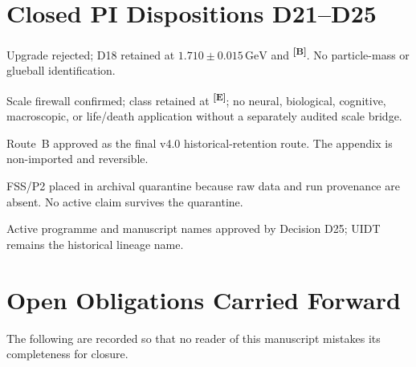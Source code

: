\documentclass[12pt,a4paper,twoside]{article}
\theoremstyle{plain}
\theoremstyle{definition}
\theoremstyle{remark}
\newcommand{\catmark}[1]{\textsuperscript{\textsf{\textbf{[#1]}}}}
\begin{document}
\section{Closed PI Dispositions D21--D25}
\label{sec:closed-pi-dispositions}

\begin{description}[leftmargin=2.8cm,style=nextline]
\item[D21 --- $\Delta$.] Upgrade rejected; D18 retained at
$1.710\pm0.015\,\mathrm{GeV}$ and \catmark{B}. No particle-mass or glueball
identification.
\item[D22 --- $E_T$.] Scale firewall confirmed; class retained at
\catmark{E}; no neural, biological, cognitive, macroscopic, or life/death
application without a separately audited scale bridge.
\item[D23 --- Museum.] Route~B approved as the final v4.0 historical-retention
route. The appendix is non-imported and reversible.
\item[D24 --- P2.] FSS/P2 placed in archival quarantine because raw data and
run provenance are absent. No active claim survives the quarantine.
\item[D25 --- Name.] Active programme and manuscript names approved by Decision D25; UIDT remains the historical lineage name.
\end{description}

\section*{Open Obligations Carried Forward}

\noindent The following are recorded so that no reader of this manuscript
mistakes its completeness for closure.
\end{document}
